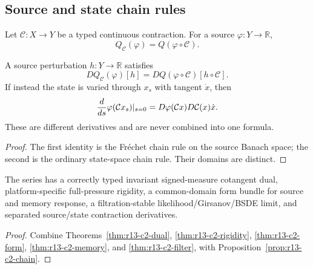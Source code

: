 \subsection{Source and state chain rules}

Let $\mathcal C:X\to Y$ be a typed continuous contraction.  For a source
$\varphi:Y\to\mathbb R$,
\[
 Q_\mathcal C(\varphi)=Q(\varphi\circ\mathcal C).
\]

\begin{proposition}
\label{prop:r13-c2-chain}
A source perturbation $h:Y\to\mathbb R$ satisfies
\[
 DQ_\mathcal C(\varphi)[h]
 =DQ(\varphi\circ\mathcal C)[h\circ\mathcal C].
\]
If instead the state is varied through $x_s$ with tangent $\dot x$, then
\[
 {d\over ds}\varphi(\mathcal Cx_s)|_{s=0}
 =D\varphi(\mathcal Cx)D\mathcal C(x)\dot x.
\]
These are different derivatives and are never combined into one formula.
\end{proposition}

\begin{proof}
The first identity is the Fréchet chain rule on the source Banach space; the
second is the ordinary state-space chain rule.  Their domains are distinct.
\end{proof}

\begin{theorem}
\label{thm:r13-c2-main}
The series has a correctly typed invariant signed-measure cotangent dual,
platform-specific full-pressure rigidity, a common-domain form bundle for
source and memory response, a filtration-stable likelihood/Girsanov/BSDE
limit, and separated source/state contraction derivatives.
\end{theorem}

\begin{proof}
Combine Theorems~\ref{thm:r13-c2-dual},
\ref{thm:r13-c2-rigidity}, \ref{thm:r13-c2-form},
\ref{thm:r13-c2-memory}, and \ref{thm:r13-c2-filter}, with
Proposition~\ref{prop:r13-c2-chain}.
\end{proof}
